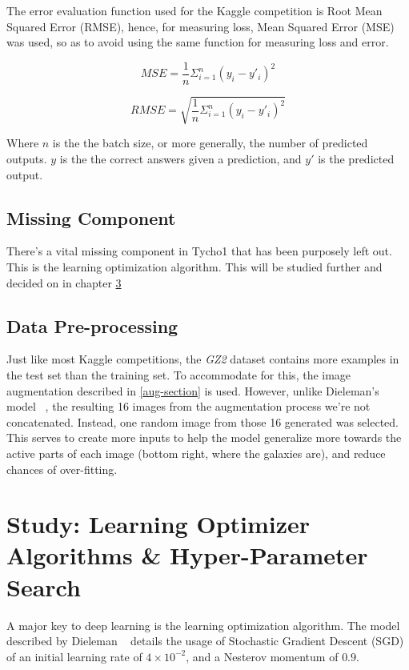 \documentclass[12pt,a4paper,oneside,oldfontcommands]{memoir}
\begin{document}
\begin{Declaration Of OriginalityOrginality}
The error evaluation function used for the Kaggle competition is Root Mean Squared Error (RMSE), hence, for measuring loss, Mean Squared Error (MSE) was used, so as to avoid using the same function for measuring loss and error.

\begin{equation}
     MSE = \frac{1}{n}\Sigma_{i=1}^{n}{({y_i -y'_i})^2}
\end{equation}

\begin{equation}
     RMSE = \sqrt{\frac{1}{n}\Sigma_{i=1}^{n}{({y_i -y'_i})^2}}
\end{equation}

Where \(n\) is the the batch size, or more generally, the number of predicted outputs. \(y\) is the the correct answers given a prediction, and \(y'\) is the predicted output.

\section{Missing Component}
There's a vital missing component in Tycho1 that has been purposely left out. This is the learning optimization algorithm. This will be studied further and decided on in chapter \ref{study1}

\section{Data Pre-processing} \label{tycho-data}

Just like most Kaggle competitions, the \textit{GZ2} dataset contains more examples in the test set than the training set. To accommodate for this, the image augmentation described in \ref{aug-section} is used. However, unlike Dieleman's model ~\cite{Sanders-GZ}, the resulting 16 images from the augmentation process we’re not concatenated. Instead, one random image from those 16 generated was selected. This serves to create more inputs to help the model generalize more towards the active parts of each image (bottom right, where the galaxies are), and reduce chances of over-fitting. 

\chapter{Study: Learning Optimizer Algorithms \& Hyper-Parameter Search} \label{study1}

A major key to deep learning is the learning optimization algorithm. The model described by Dieleman ~\cite{Sanders-GZ} details the usage of Stochastic Gradient Descent (SGD) of an initial learning rate of \(4\times10^{-2}\), and a Nesterov momentum of \(0.9\). 


\end{Declaration Of OriginalityOrginality}
\end{document}
